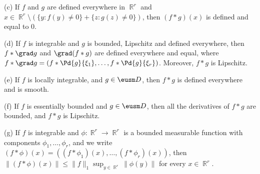 (c) If $f$ and $g$ are defined everywhere in $\BbbR^r$ and
$x\in\BbbR^r\setminus(\{y:f(y)\ne 0\}+\{z:g(z)\ne 0\})$, then $(f*g)(x)$
is defined and equal to $0$.

(d) If $f$ is integrable and $g$ is bounded, Lipschitz and defined
everywhere, then $f*\grad g$ and $\grad(f*g)$ are defined everywhere and
equal, where $f*\grad g=(f*\Pd{g}{\xi_1},\ldots,f*\Pd{g}{\xi_r})$.
Moreover, $f*g$ is Lipschitz.

(e) If $f$ is locally integrable, and $g\in\eusm D$,
then $f*g$ is defined everywhere and is smooth.

(f) If $f$ is essentially bounded and $g\in\eusm D$, then all the
derivatives of $f*g$ are bounded, and $f*g$ is Lipschitz.

(g) If $f$ is integrable and $\phi:\BbbR^r\to\BbbR^r$ is a bounded
measurable function with components $\phi_1,\ldots,\phi_r$, and we write
$(f*\phi)(x)=((f*\phi_1)(x),\ldots,(f*\phi_r)(x))$, then
$\|(f*\phi)(x)\|\le\|f\|_1\sup_{y\in\BbbR^r}\|\phi(y)\|$ for every
$x\in\BbbR^r$.

